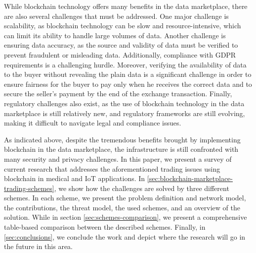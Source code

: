 While blockchain technology offers many benefits in the data marketplace, there are also several challenges that must be addressed. 
One major challenge is scalability, as blockchain technology can be slow and resource-intensive, which can limit its ability to handle large volumes of data.
Another challenge is ensuring data accuracy, as the source and validity of data must be verified to prevent fraudulent or misleading data.
Additionally, compliance with GDPR requirements is a challenging hurdle.
Moreover, verifying the availability of data to the buyer without revealing the plain data is a significant challenge in order to ensure fairness for the buyer to pay only when he receives the correct data and to secure the seller's payment by the end of the exchange transaction.
Finally, regulatory challenges also exist, as the use of blockchain technology in the data marketplace is still relatively new, and regulatory frameworks are still evolving, making it difficult to navigate legal and compliance issues.

As indicated above, despite the tremendous benefits brought by implementing blockchain in the data marketplace, the infrastructure is still confronted with many security and privacy challenges.
In this paper, we present a survey of current research that addresses the aforementioned trading issues using blockchain in medical and IoT applications.
In \cref{sec:blockchain-marketplace-trading-schemes}, we show how the challenges are solved by three different schemes.
In each scheme, we present the problem definition and network model, the contributions, the threat model, the used schemes, and an overview of the solution.
While in section \cref{sec:schemes-comparison}, we present a comprehensive table-based comparison between the described schemes.
Finally, in \cref{sec:conclusions}, we conclude the work and depict where the research will go in the future in this area.
